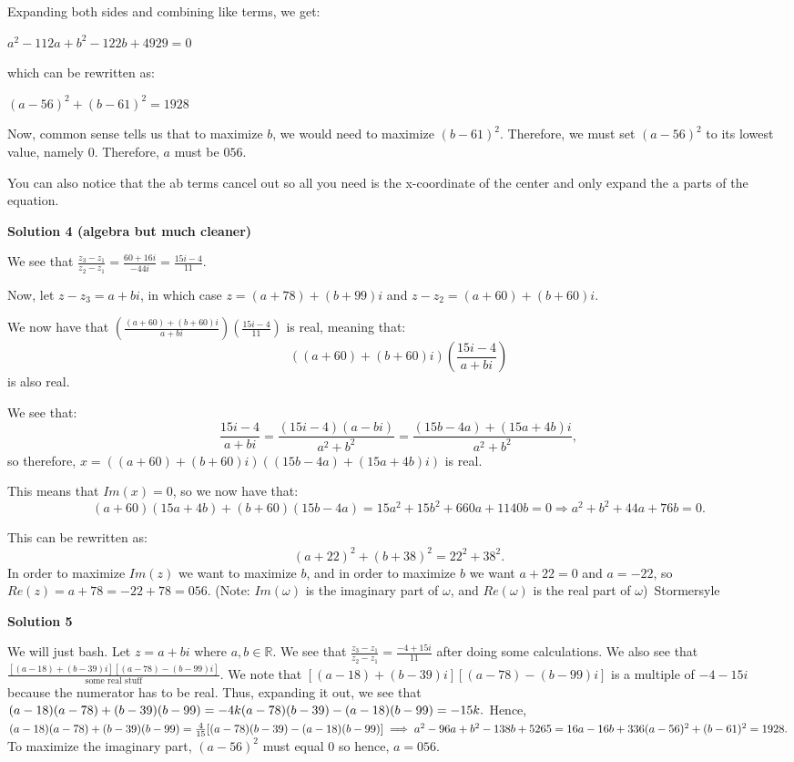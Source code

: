\begin{enumerate}
 Expanding both sides and combining like terms, we get:

 $a^2 - 112a +b^2 - 122b + 4929 = 0$

 which can be rewritten as:

 $(a-56)^2 + (b-61)^2 = 1928$

 Now, common sense tells us that to maximize $b$, we would need to maximize $(b-61)^2$. Therefore, we must set $(a-56)^2$ to its lowest value, namely 0. Therefore, $a$ must be $\boxed{056}.$

 You can also notice that the ab terms cancel out so all you need is the x-coordinate of the center and only expand the a parts of the equation.

 



\textbf{Solution 4 (algebra but much cleaner)}

We see that $\frac{z_3-z_1}{z_2-z_1}=\frac{60+16i}{-44i}=\frac{15i-4}{11}$. 

 Now, let $z-z_3=a+bi$, in which case $z=(a+78)+(b+99)i$ and $z-z_2=(a+60)+(b+60)i$. 

 We now have that $\left(\frac{(a+60)+(b+60)i}{a+bi}\right)\left(\frac{15i-4}{11}\right)$ is real, meaning that:
 \[((a+60)+(b+60)i)\left(\frac{15i-4}{a+bi}\right)\]is also real. 

 We see that:
 \[\frac{15i-4}{a+bi}=\frac{(15i-4)(a-bi)}{a^2+b^2}=\frac{(15b-4a)+(15a+4b)i}{a^2+b^2},\]so therefore, $x=((a+60)+(b+60)i)((15b-4a)+(15a+4b)i)$ is real. 

 This means that $Im(x)=0$, so we now have that:
 \[(a+60)(15a+4b)+(b+60)(15b-4a)=15a^2+15b^2+660a+1140b=0 \Rightarrow a^2+b^2+44a+76b=0.\] 

 This can be rewritten as:
 \[(a+22)^2+(b+38)^2=22^2+38^2.\] In order to maximize $Im(z)$ we want to maximize $b$, and in order to maximize $b$ we want $a+22=0$ and $a=-22$, so $Re(z)=a+78=-22+78=\boxed{056}$. (Note: $Im(\omega)$ is the imaginary part of $\omega$, and $Re(\omega)$ is the real part of $\omega$)~Stormersyle

 



\textbf{Solution 5}

We will just bash. Let $z=a+bi$ where $a,b\in\mathbb{R}$. We see that $\frac{z_3-z_1}{z_2-z_1}=\frac{-4+15i}{11}$ after doing some calculations. We also see that $\frac{[(a-18)+(b-39)i][(a-78)-(b-99)i]}{\text{some real stuff}}.$ We note that $[(a-18)+(b-39)i][(a-78)-(b-99)i]$ is a multiple of $-4-15i$ because the numerator has to be real. Thus, expanding it out, we see that $(a-18)(a-78)+(b-39)(b-99)=-4k \\ (a-78)(b-39)-(a-18)(b-99)=-15k.$ Hence, $(a-18)(a-78)+(b-39)(b-99)=\frac{4}{15}[(a-78)(b-39)-(a-18)(b-99)] \implies a^2-96a+b^2-138b+5265=16a-16b+336 \\ (a-56)^2+(b-61)^2=1928.$ To maximize the imaginary part, $(a-56)^2$ must equal $0$ so hence, $a=\boxed{056}$.


\end{enumerate}
